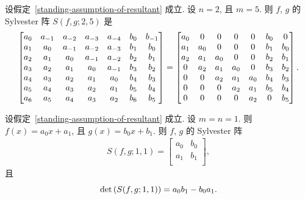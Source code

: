 \documentclass[../libro.tex]{subfiles}
\begin{document}
\begin{example}
    设假定~\ref{standing-assumption-of-resultant} 成立.
    设 \(n = 2\), 且 \(m = 5\).
    则 \(f\), \(g\) 的 Sylvester 阵
    \(S(f, g; 2, 5)\) 是
    \begin{equation*}
        \begin{bmatrix}
            a_{0} & a_{-1} & a_{-2} & a_{-3} & a_{-4} & b_{0} & b_{-1} \\
            a_{1} & a_{0}  & a_{-1} & a_{-2} & a_{-3} & b_{1} & b_{0}  \\
            a_{2} & a_{1}  & a_{0}  & a_{-1} & a_{-2} & b_{2} & b_{1}  \\
            a_{3} & a_{2}  & a_{1}  & a_{0}  & a_{-1} & b_{3} & b_{2}  \\
            a_{4} & a_{3}  & a_{2}  & a_{1}  & a_{0}  & b_{4} & b_{3}  \\
            a_{5} & a_{4}  & a_{3}  & a_{2}  & a_{1}  & b_{5} & b_{4}  \\
            a_{6} & a_{5}  & a_{4}  & a_{3}  & a_{2}  & b_{6} & b_{5}  \\
        \end{bmatrix}
        =
        \begin{bmatrix}
            a_0 & 0   & 0   & 0   & 0   & b_0 & 0   \\
            a_1 & a_0 & 0   & 0   & 0   & b_1 & b_0 \\
            a_2 & a_1 & a_0 & 0   & 0   & b_2 & b_1 \\
            0   & a_2 & a_1 & a_0 & 0   & b_3 & b_2 \\
            0   & 0   & a_2 & a_1 & a_0 & b_4 & b_3 \\
            0   & 0   & 0   & a_2 & a_1 & b_5 & b_4 \\
            0   & 0   & 0   & 0   & a_2 & 0   & b_5 \\
        \end{bmatrix}.
        \qedhere
    \end{equation*}
\end{example}

\begin{example}
    设假定~\ref{standing-assumption-of-resultant} 成立.
    设 \(m = n = 1\).
    则 \(f(x) = a_0 x + a_1\),
    且 \(g(x) = b_0 x + b_1\).
    则 \(f\), \(g\) 的 Sylvester 阵
    \begin{align*}
        S(f, g; 1, 1) =
        \begin{bmatrix}
            a_0 & b_0 \\
            a_1 & b_1 \\
        \end{bmatrix},
    \end{align*}
    且
    \begin{equation*}
        \det {(S(f, g; 1, 1))} = a_0 b_1 - b_0 a_1.
        \qedhere
    \end{equation*}
\end{example}
\end{document}
